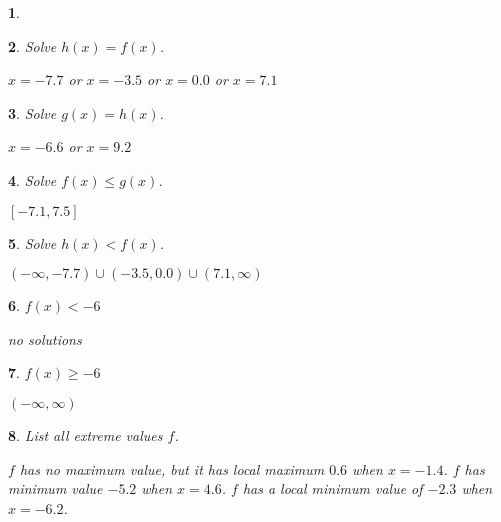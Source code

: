 \documentclass{amsbook}
\newtheorem{exc}{}
\newenvironment{ex}{\begin{exc}\normalfont}{\end{exc}}
\numberwithin{section}{chapter}
\numberwithin{equation}{chapter}
\begin{document}
\begin{multicols}{2}
\begin{ex}
\end{ex}
\begin{ex}
	Solve $h(x) = f(x)$.
	\begin{sol}
		$x=-7.7$ or $x=-3.5$ or $x=0.0$ or $x=7.1$
	\end{sol}
\end{ex}
\begin{ex}
	Solve $g(x) = h(x)$.
	\begin{sol}
		$x=-6.6$ or $x=9.2$
	\end{sol}
\end{ex}
\begin{ex}
	Solve $f(x) \leq g(x)$.
	\begin{sol}
		$[-7.1, 7.5]$
	\end{sol}
\end{ex}
\begin{ex}
	Solve $h(x) < f(x)$.
	\begin{sol}
		$(-\infty, -7.7)\cup (-3.5, 0.0)\cup (7.1, \infty)$
	\end{sol}
\end{ex}
\begin{ex}
	$f(x) < -6$
	\begin{sol}
		no solutions
	\end{sol}
\end{ex}
\begin{ex}
	$f(x) \geq -6$
	\begin{sol}
		$(-\infty, \infty)$
	\end{sol}
\end{ex}
\begin{ex}
	List all extreme values $f$.
	\begin{sol}
		$f$ has no maximum value, but it has local maximum $0.6$ when $x=-1.4$. $f$ has minimum value $-5.2$ when $x=4.6$. $f$ has a local minimum value of $-2.3$ when $x=-6.2$.
	\end{sol}
\end{ex}
\end{multicols}
\end{document}
